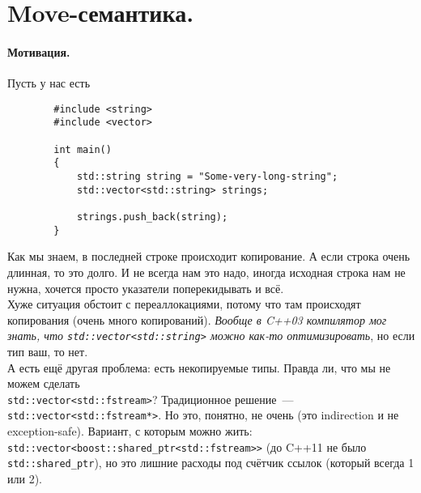 \documentclass{article}
\begin{document}
    \tableofcontents\pagebreak
    \setcounter{page}{1}
    \section{Move-семантика.}
    \paragraph{Мотивация.}
    Пусть у нас есть
    \begin{verbatim}
        #include <string>
        #include <vector>

        int main()
        {
            std::string string = "Some-very-long-string";
            std::vector<std::string> strings;
            
            strings.push_back(string);
        }
    \end{verbatim}
    Как мы знаем, в последней строке происходит копирование. А если строка очень длинная, то это долго. И не всегда нам это надо, иногда исходная строка нам не нужна, хочется просто указатели поперекидывать и всё.\\
    Хуже ситуация обстоит с переаллокациями, потому что там происходят копирования (очень много копирований). \textit{Вообще в C++03 компилятор мог знать, что \texttt{std::vector<std::string>} можно как-то оптимизировать}, но если тип ваш, то нет.\\
    А есть ещё другая проблема: есть некопируемые типы. Правда ли, что мы не можем сделать\\\texttt{std::vector<std::fstream>}? Традиционное решение~--- \texttt{std::vector<std::fstream*>}. Но это, понятно, не очень (это indirection и не exception-safe). Вариант, с которым можно жить:\\
    \label{абьюз shared_ptr}\texttt{std::vector<boost::shared_ptr<std::fstream>>} (до C++11 не было \texttt{std::shared_ptr}), но это лишние расходы под счётчик ссылок (который всегда 1 или 2).
\end{document}
